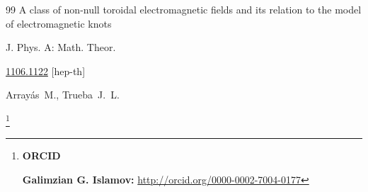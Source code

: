 \begin{thebibliography}{99}
\paper A class of non-null toroidal electromagnetic fields and its relation to the model of electromagnetic knots


\jour J. Phys. A: Math. Theor. 





\arxiv \href{http://arxiv.org/abs/1106.1122}{1106.1122} [hep-th]

\by Array\'as~M., Trueba~J.~L.



\end{thebibliography}



\RuDate







\bigskip





\makeentitle







\thanks{{\bf ORCID}







{\bf Galimzian G. Islamov:} \url{http://orcid.org/0000-0002-7004-0177}



}





\EngRef



